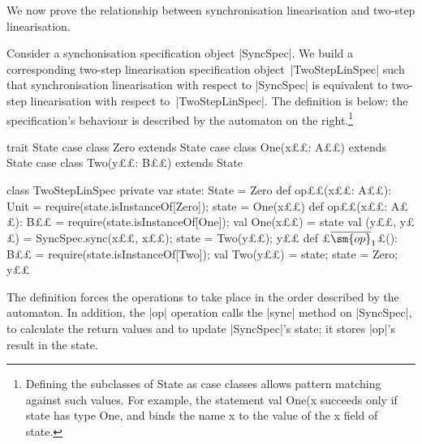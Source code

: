 We now prove the relationship between synchronisation linearisation and
two-step linearisation.

Consider a synchonisation specification object |SyncSpec|.  We build a
corresponding two-step linearisation specification object~|TwoStepLinSpec|
such that synchronisation linearisation with respect to |SyncSpec| is
equivalent to two-step linearisation with respect to~|TwoStepLinSpec|.  The
definition is below: the specification's behaviour is described by the
automaton on the right.\footnote{Defining the subclasses of {\scalashape
    State} as {\scalashape case class}es allows pattern matching against such
  values.  For example, the statement {\scalashape val One(x} succeeds only if {\scalashape state} has type {\scalashape One},
  and binds the name {\scalashape x} to the value of the {\scalashape x}
  field of {\scalashape state}.}
\begin{trivlist}
\item[]
\begin{minipage}[b]{68mm}
\begin{scala}
trait State
case class Zero extends State
case class One(x££: A££) extends State
case class Two(y££: B££) extends State
\end{scala}
\end{minipage}
%
\hfil
%
\begin{minipage}[b]{63mm}
\end{minipage}
%
%
%
\begin{scala}
class TwoStepLinSpec{
  private var state: State = Zero
  def op££(x££: A££): Unit = {
    require(state.isInstanceOf[Zero]); state = One(x££)
  }
  def op££(x££: A££): B££ = {
    require(state.isInstanceOf[One]); val One(x££) = state
    val (y££, y££) = SyncSpec.sync(x££, x££); state = Two(y££); y££
  }
  def £$\overline{\sm{op}}_1$£(): B££ = {
    require(state.isInstanceOf[Two]); val Two(y££) = state; state = Zero; y££
  }
}
\end{scala}
\end{trivlist}
%
%
The definition forces the operations to take place in the order described by
the automaton.  In addition, the |op| operation calls the |sync| method on
|SyncSpec|, to calculate the return values and to update |SyncSpec|'s state;
it stores |op|'s result in the state. 

